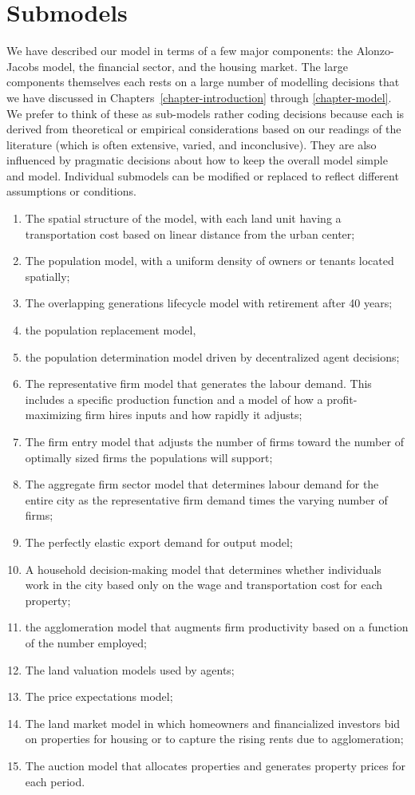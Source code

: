 \section{Submodels}
We have described our model in terms of a few major components: the Alonzo-Jacobs model, the financial sector, and the housing market.  The large components themselves each rests on a large number of modelling decisions that we have discussed in Chapters~\ref{chapter-introduction}  through \ref{chapter-model}. We prefer to think of these as sub-models rather coding decisions because each is derived from theoretical or empirical considerations based on our readings of the literature (which is often extensive, varied, and inconclusive). They are also influenced by pragmatic decisions about how to keep the overall model simple and model. Individual submodels can be modified or replaced to reflect different assumptions or conditions.
 
\begin{enumerate}
    \item The spatial structure of the model, with each land unit having a transportation cost based on linear distance from the urban center;
    \item The population model, with a uniform density of owners or tenants located spatially; 
    \item The overlapping generations lifecycle model with retirement after 40 years;
    \item the population replacement model, 
    \item the population determination model driven by decentralized agent decisions;
    \item The representative firm model that generates the labour demand. This includes a specific production function and a model of how a profit-maximizing firm hires inputs and how rapidly it adjusts;
    \item The firm entry model that adjusts the number of firms toward the number of optimally sized firms the populations will support;
    \item The aggregate firm sector model that determines labour demand for the entire city as the representative firm demand times the varying number of firms;
    \item The perfectly elastic export demand for output model; 
    \item A household decision-making model that determines whether individuals work in the city based only on the wage and transportation cost for each property; 
    \item the agglomeration model that augments firm productivity based on a function of the number employed;
    \item The land valuation models used by agents; 
    \item The price expectations model;
    \item The land market model in which homeowners and financialized investors bid on properties for housing or to capture the rising rents due to agglomeration;
    \item The auction model that allocates properties and generates property prices for each period.
\end{enumerate}


